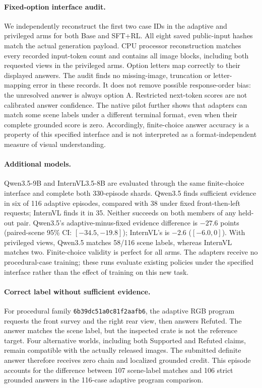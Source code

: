 \paragraph{Fixed-option interface audit.}
We independently reconstruct the first two case IDs in the adaptive and privileged arms for both Base and SFT+RL.
All eight saved public-input hashes match the actual generation payload.
CPU processor reconstruction matches every recorded input-token count and contains all image blocks, including both requested views in the privileged arms.
Option letters map correctly to their displayed answers.
The audit finds no missing-image, truncation or letter-mapping error in these records.
It does not remove possible response-order bias: the unresolved answer is always option A.
Restricted next-token scores are not calibrated answer confidence.
The native pilot further shows that adapters can match some scene labels under a different terminal format, even when their complete grounded score is zero.
Accordingly, finite-choice answer accuracy is a property of this specified interface and is not interpreted as a format-independent measure of visual understanding.

\paragraph{Additional models.}
Qwen3.5-9B and InternVL3.5-8B are evaluated through the same finite-choice interface and complete both 330-episode shards.
Qwen3.5 finds sufficient evidence in six of 116 adaptive episodes, compared with 38 under fixed front-then-left requests; InternVL finds it in 35.
Neither succeeds on both members of any held-out pair.
Qwen3.5's adaptive-minus-fixed evidence difference is $-27.6$ points (paired-scene 95\% CI: $[-34.5,-19.8]$); InternVL's is $-2.6$ ($[-6.0,0]$).
With privileged views, Qwen3.5 matches 58/116 scene labels, whereas InternVL matches two.
Finite-choice validity is perfect for all arms.
The adapters receive no procedural-case training; these runs evaluate existing policies under the specified interface rather than the effect of training on this new task.


\paragraph{Correct label without sufficient evidence.}
For procedural family \texttt{6b39dc51a0c81f2aafb6}, the adaptive RGB program requests the front survey and the right rear view, then answers Refuted.
The answer matches the scene label, but the inspected crate is not the reference target.
Four alternative worlds, including both Supported and Refuted claims, remain compatible with the actually released images.
The submitted definite answer therefore receives zero chain and localized grounded credit.
This episode accounts for the difference between 107 scene-label matches and 106 strict grounded answers in the 116-case adaptive program comparison.
